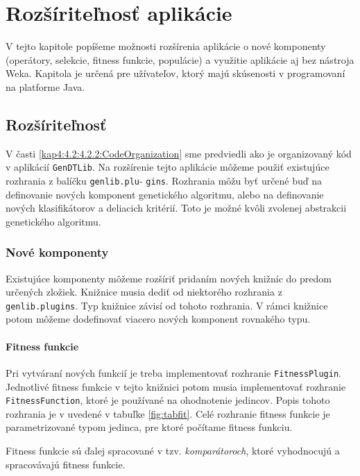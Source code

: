 \chapter{Rozšíriteľnosť aplikácie}\label{kapIII}
V tejto kapitole popíšeme možnosti rozšírenia aplikácie o nové komponenty (operátory, selekcie, fitness funkcie, populácie) a využitie aplikácie aj bez nástroja Weka. Kapitola je určená pre užívateľov, ktorý majú skúsenosti v programovaní na platforme Java.

\section{Rozšíriteľnosť}\label{kap4:4.4:Plugin}
V časti \ref{kap4:4.2:4.2.2:CodeOrganization} sme predviedli ako je organizovaný kód v aplikácií \verb|GenDTLib|.
Na rozšírenie tejto aplikácie môžeme použiť existujúce rozhrania z balíčku \verb|genlib.plu|- \verb|gins|. Rozhrania môžu byť určené buď na definovanie nových komponent genetického algoritmu, alebo na definovanie nových klasifikátorov a deliacich kritérií. Toto je možné kvôli zvolenej abstrakcii genetického algoritmu.
\subsection{Nové komponenty}
Existujúce komponenty môžeme rozšíriť pridaním nových knižníc do predom určených zložiek. Knižnice musia dediť od niektorého rozhrania z \verb|genlib.plugins|. Typ knižnice závisí od tohoto rozhrania. V rámci knižnice potom môžeme  dodefinovať viacero nových komponent rovnakého typu. 

\subsubsection*{Fitness funkcie}
Pri vytváraní nových funkcií je treba implementovať rozhranie \verb|FitnessPlugin|. Jednotlivé fitness funkcie v tejto knižnici potom musia implementovať rozhranie \verb|FitnessFunction|, ktoré je používané na ohodnotenie jedincov.
Popis tohoto rozhrania je v uvedené v tabuľke \ref{fig:tabfit}. Celé rozhranie fitness funkcie je parametrizované typom jedinca, pre ktoré počítame fitness funkciu.

Fitness funkcie sú ďalej spracované v tzv. \emph{komparátoroch}, ktoré vyhodnocujú a spracovávajú fitness funkcie.

